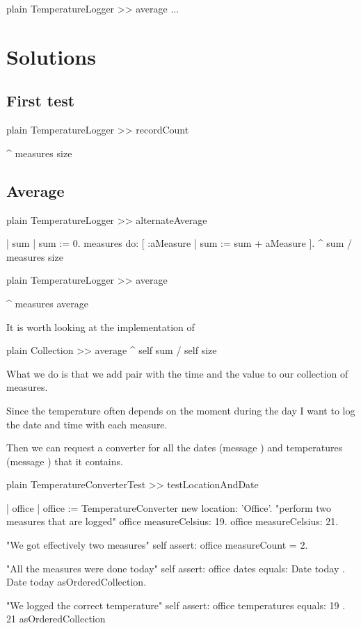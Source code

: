 \documentclass[10pt,twoside,english]{_support/latex/sbabook/sbabook}
\begin{document}
\begin{displaycode}{plain}
TemperatureLogger >> average
   ...
\end{displaycode}
\section{Solutions}\subsection{First test}
\begin{displaycode}{plain}
TemperatureLogger >> recordCount

    ^ measures size
\end{displaycode}
\subsection{Average}
\begin{displaycode}{plain}
TemperatureLogger >> alternateAverage

        | sum |
        sum := 0.
        measures do: [ :aMeasure | sum := sum + aMeasure ].
        ^ sum / measures size
\end{displaycode}

\begin{displaycode}{plain}
TemperatureLogger >> average

    ^ measures average
\end{displaycode}

It is worth looking at the implementation of 

\begin{displaycode}{plain}
Collection >> average
    ^ self sum / self size
\end{displaycode}

What we do is that we add pair with the time and the value to our collection of measures.

Since the temperature often depends on the moment during the day I want to log the date and time with each measure.

Then we can request a converter for all the dates (message ) and temperatures (message ) that it contains.

\begin{displaycode}{plain}
TemperatureConverterTest >> testLocationAndDate

    | office |
    office := TemperatureConverter new location: 'Office'.
    "perform two measures that are logged"
    office measureCelsius: 19.
    office measureCelsius: 21.

    "We got effectively two measures"
    self assert: office measureCount = 2.

    "All the measures were done today"
    self assert: office dates equals: {Date today . Date today} asOrderedCollection.

    "We logged the correct temperature"
    self assert: office temperatures equals: { 19 . 21 } asOrderedCollection
\end{displaycode}
\end{document}
